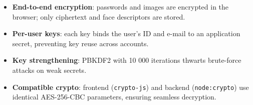 \begin{itemize}
  \item \textbf{End-to-end encryption}: passwords and images are encrypted in the browser; only ciphertext and face descriptors are stored.  
  \item \textbf{Per-user keys}: each key binds the user's ID and e-mail to an application secret, preventing key reuse across accounts.  
  \item \textbf{Key strengthening}: PBKDF2 with 10 000 iterations thwarts brute-force attacks on weak secrets.  
  \item \textbf{Compatible crypto}: frontend (\texttt{crypto-js}) and backend (\texttt{node:crypto}) use identical AES-256-CBC parameters, ensuring seamless decryption.  
\end{itemize}

